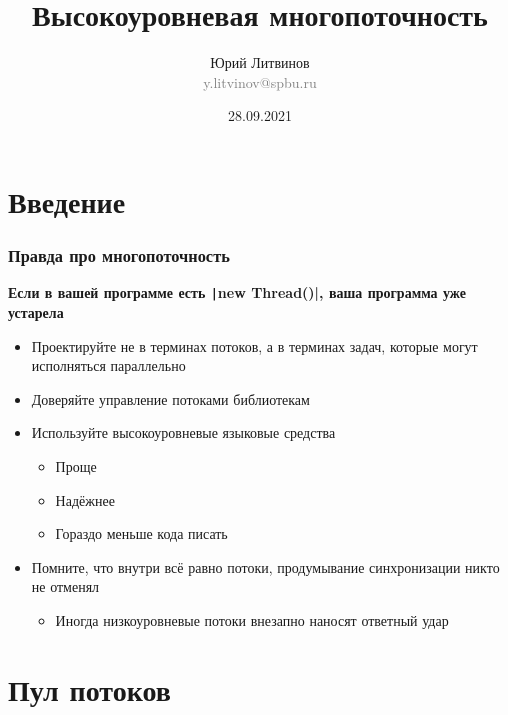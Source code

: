\documentclass[xetex,mathserif,serif]{beamer}
\title{Высокоуровневая многопоточность}
\author[Юрий Литвинов]{Юрий Литвинов\\\small{\textcolor{gray}{y.litvinov@spbu.ru}}}
\date{28.09.2021}
\begin{document}
    \frame{\titlepage}

    \section{Введение}

    \begin{frame}
        \frametitle{Правда про многопоточность}
        \textbf{Если в вашей программе есть \texttt|new Thread()|, ваша программа уже устарела}
        \begin{itemize}
            \item Проектируйте не в терминах потоков, а в терминах задач, которые могут исполняться параллельно
            \item Доверяйте управление потоками библиотекам
            \item Используйте высокоуровневые языковые средства
            \begin{itemize}
                \item Проще
                \item Надёжнее
                \item Гораздо меньше кода писать
            \end{itemize}
            \item Помните, что внутри всё равно потоки, продумывание синхронизации никто не отменял
            \begin{itemize}
                \item Иногда низкоуровневые потоки внезапно наносят ответный удар
            \end{itemize}
        \end{itemize}
    \end{frame}

    \section{Пул потоков}
\end{document}
